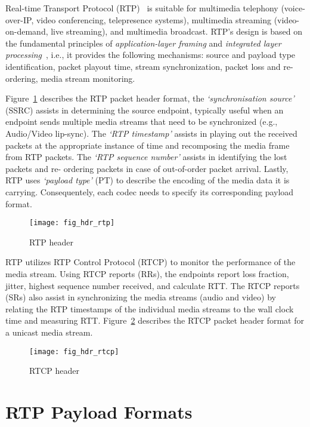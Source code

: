 
Real-time Transport Protocol (RTP)~\cite{rfc3550} is suitable for multimedia
telephony (voice-over-IP, video conferencing, telepresence systems),
multimedia streaming (video-on-demand, live streaming), and multimedia
broadcast. RTP's design is based on the fundamental principles of \textit
{application-layer framing} and \textit{integrated layer
processing}~\cite{clark:alf}, i.e., it provides the following mechanisms:
source and payload type identification, packet playout time, stream
synchronization, packet loss and re-ordering, media stream monitoring.

Figure~\ref{fig:3:rtp.hdr} describes the RTP packet header format, the
\textit{`synchronisation source'} (SSRC) assists in determining the source
endpoint, typically useful when an endpoint sends multiple media streams that
need to be synchronized (e.g., Audio/Video lip-sync). The \textit{`RTP
timestamp'} assists in playing out the received packets at the appropriate
instance of time and recomposing the media frame from RTP packets. The
\textit{`RTP sequence number'} assists in identifying the lost packets and re-
ordering packets in case of out-of-order packet arrival. Lastly, RTP uses
\textit{`payload type'} (PT) to describe the encoding of the media data it is
carrying. Consequentely, each codec needs to specify its corresponding payload
format.

\begin{figure}[!htbp]
\centerline{\texttt{[image: fig\_hdr\_rtp]}}
\caption{RTP header}
\label{fig:3:rtp.hdr}
\end{figure}

RTP utilizes RTP Control Protocol (RTCP) to monitor the performance of the
media stream. Using RTCP reports (RRs), the endpoints report loss fraction,
jitter, highest sequence number received, and calculate RTT. The RTCP reports
(SRs) also assist in synchronizing the media streams (audio and video) by
relating the RTP timestamps of the individual media streams to the wall clock
time and measuring RTT. Figure~\ref{fig:3:rtcp.hdr} describes the RTCP packet
header format for a unicast media stream.

\begin{figure}
\centerline{\texttt{[image: fig\_hdr\_rtcp]}}
\caption{RTCP header}
\label{fig:3:rtcp.hdr}
\end{figure}

\section{RTP Payload Formats}

